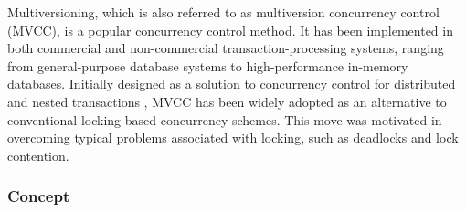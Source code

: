 %

Multiversioning, which is also referred to as multiversion concurrency control
(MVCC), is a popular concurrency control method. It has been implemented in both
commercial and non-commercial transaction-processing systems, ranging from
general-purpose database systems to high-performance in-memory databases.
Initially designed as a solution to concurrency control for distributed and
nested transactions \cite{reed1978naming}, MVCC has been widely adopted as an
alternative to conventional locking-based concurrency schemes. This move was
motivated in overcoming typical problems associated with locking, such as
deadlocks and lock contention.

\subsubsection{Concept}

